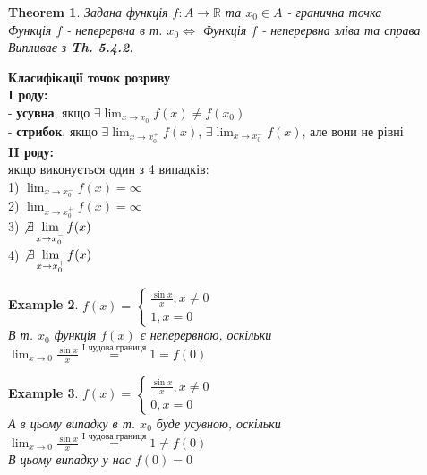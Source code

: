 \documentclass[a4paper, 14pt]{extarticle}
\def\huge{\displaystyle}
\def\bigline{\vspace{5mm}\\}
\theoremstyle{theoremdd}
\newtheorem{theorem}{Theorem}[subsection]
\theoremstyle{theoremdd}
\theoremstyle{theoremdd}
\theoremstyle{theoremdd}
\newtheorem{example}[theorem]{Example}
\theoremstyle{theoremdd}
\theoremstyle{theoremdd}
\theoremstyle{theoremdd}
\theoremstyle{theoremdd}
\begin{document}
\begin{theorem}
Задана функція $f: A \to \mathbb{R}$ та $x_0 \in A$ - гранична точка\\
Функція $f$ - неперервна в т. $x_0 \iff$ Функція $f$ - неперервна зліва та справа\\
\textit{Випливає з} \textbf{Th. 5.4.2.}
\end{theorem}

\textbf{Класифікації точок розриву}\\
\textbf{I роду:}\\
- \textbf{усувна}, якщо $\exists \huge \lim_{x \to x_0} f(x) \neq f(x_0)$\\
- \textbf{стрибок}, якщо $\exists \huge \lim_{x \to x_0^+} f(x)$, $\exists \huge \lim_{x \to x_0^-} f(x)$, але вони не рівні
\bigline
\textbf{II роду:}\\
якщо виконується один з 4 випадків:\\
1) $\huge \lim_{x \to x_0^-} f(x) = \infty$\\
2) $\huge \lim_{x \to x_0^+} f(x) = \infty$\\
3) $\huge \not\exists \lim_{x \to x_0^-} f(x)$\\
4) $\huge \not\exists \lim_{x \to x_0^+} f(x)$\\

\begin{example}
$f(x) = \begin{cases} \huge \frac{\sin x}{x}, x \neq 0 \\ 1, x = 0 \end{cases}$\\
В т. $x_0$ функція $f(x)$ є неперервною, оскільки
\bigline
$\huge \lim_{x \to 0} \frac{\sin x}{x} \overset{\textrm{I чудова границя}}{=} 1 = f(0)$
\end{example}

\begin{example}
$f(x) = \begin{cases} \huge \frac{\sin x}{x}, x \neq 0 \\ 0, x = 0 \end{cases}$\\
А в цьому випадку в т. $x_0$ буде усувною, оскільки\\
$\huge \lim_{x \to 0} \frac{\sin x}{x} \overset{\textrm{I чудова границя}}{=} 1 \neq f(0)$\\
В цьому випадку у нас $f(0) = 0$\\
\begin{figure} [H]
\centering
\resizebox{1\textwidth}{!}
{
}
\end{figure}
\end{example}
\end{document}
